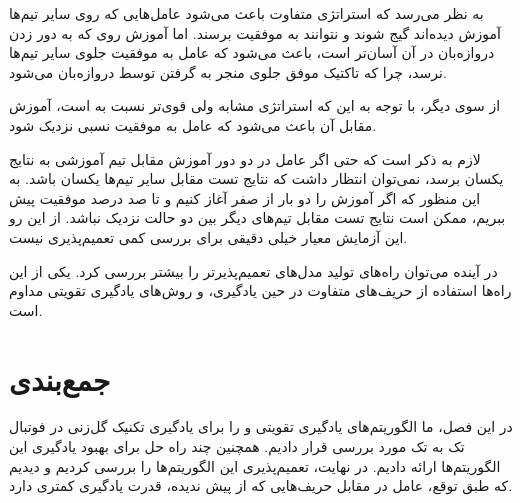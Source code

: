 به نظر می‌رسد که استراتژی متفاوت  باعث می‌شود عامل‌هایی که روی سایر تیم‌ها آموزش دیده‌اند گیج شوند و نتوانند به موفقیت برسند.
اما آموزش روی  که به دور زدن دروازه‌بان در آن آسان‌تر است، باعث می‌شود که عامل 
به موفقیت جلوی سایر تیم‌ها نرسد، چرا که تاکتیک موفق جلوی  منجر به گرفتن توسط دروازه‌بان می‌شود.

از سوی دیگر، با توجه به این که استراتژی  مشابه ولی قوی‌تر نسبت به  است، آموزش مقابل آن باعث می‌شود که عامل به موفقیت نسبی نزدیک شود.

لازم به ذکر است که حتی اگر عامل در دو دور آموزش مقابل تیم آموزشی به نتایج یکسان برسد، نمی‌توان انتظار داشت که نتایج تست مقابل سایر تیم‌ها یکسان باشد. به این منظور که اگر آموزش را دو بار از صفر آغاز کنیم و تا صد درصد موفقیت پیش ببریم، ممکن است نتایج تست مقابل تیم‌های دیگر بین دو حالت نزدیک نباشد. از این رو این آزمایش معیار خیلی دقیقی برای بررسی کمی تعمیم‌پذیری نیست.

در آینده می‌توان راه‌های تولید مدل‌های تعمیم‌پذیر‌تر را بیشتر بررسی کرد. یکی از این راه‌ها استفاده از حریف‌های متفاوت در حین یادگیری، و روش‌های یادگیری تقویتی مداوم است.

\section{جمع‌بندی}
در این فصل، ما الگوریتم‌های یادگیری تقویتی  و  را برای یادگیری تکنیک گل‌زنی در فوتبال تک به تک مورد بررسی قرار دادیم.
همچنین چند راه حل برای بهبود یادگیری این الگوریتم‌ها ارائه دادیم.
در نهایت، تعمیم‌پذیری این الگوریتم‌ها را بررسی کردیم و دیدیم که طبق توقع، عامل در مقابل حریف‌هایی که از پیش ندیده، قدرت یادگیری کمتری دارد.

